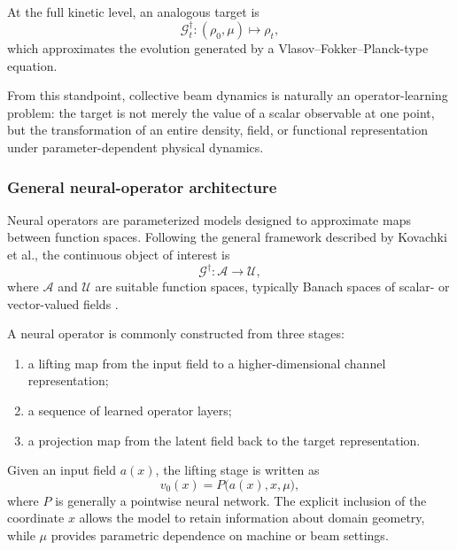 \documentclass[11pt,a4paper]{article}
\begin{document}
\begin{sloppypar}
At the full kinetic level, an analogous target is
\begin{equation}
\mathcal{G}^{\dagger}_{t}
:
(\rho_0,\mu)
\longmapsto
\rho_t,
\label{eq:NO_VFP_operator}
\end{equation}
which approximates the evolution generated by a Vlasov--Fokker--Planck-type equation.

From this standpoint, collective beam dynamics is naturally an operator-learning problem: the target is not merely the value of a scalar observable at one point, but the transformation of an entire density, field, or functional representation under parameter-dependent physical dynamics.

\subsubsection{General neural-operator architecture}
\label{subsubsec:general_neural_operator}

Neural operators are parameterized models designed to approximate maps between function spaces. Following the general framework described by Kovachki et al., the continuous object of interest is
\begin{equation}
\mathcal{G}^{\dagger}
:
\mathcal{A}
\longrightarrow
\mathcal{U},
\end{equation}
where $\mathcal{A}$ and $\mathcal{U}$ are suitable function spaces, typically Banach spaces of scalar- or vector-valued fields \cite{kovachki_neural_2023}.

A neural operator is commonly constructed from three stages:

\begin{enumerate}[label=(\roman*)]
\item a lifting map from the input field to a higher-dimensional channel representation;
\item a sequence of learned operator layers;
\item a projection map from the latent field back to the target representation.
\end{enumerate}

Given an input field $a(x)$, the lifting stage is written as
\begin{equation}
v_0(x)
=
P
\bigl(
a(x),
x,
\mu
\bigr),
\label{eq:NO_lift}
\end{equation}
where $P$ is generally a pointwise neural network. The explicit inclusion of the coordinate $x$ allows the model to retain information about domain geometry, while $\mu$ provides parametric dependence on machine or beam settings.


\end{sloppypar}
\end{document}
